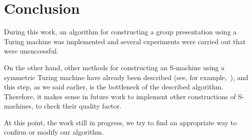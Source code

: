 \documentclass[conference]{IEEEtran}
\theoremstyle{definition}
\begin{document}
\section{Conclusion}

During this work, an algorithm for constructing a group presentation
using a Turing machine was implemented and several experiments were
carried out that were unsuccessful.

On the other hand, other methods for constructing an S-machine
using a symmetric Turing machine have already been described
(see, for example,~\cite{SpaceFunc}), and this step, as we said earlier,
is the bottleneck of the described algorithm.
Therefore, it makes sense in future work to implement other constructions
of S-machines, to check their quality factor.

At this point, the work still in progress, we try to find an appropriate
way to confirm or modify our algorithm.



\end{document}
